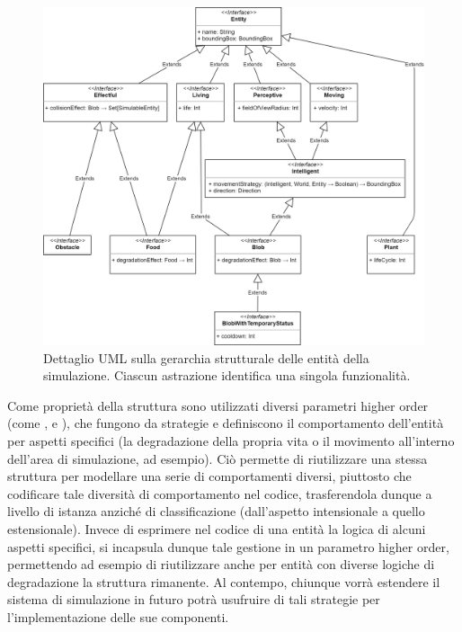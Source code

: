 \begin{figure}[h!]
\centering
\includegraphics[width=\textwidth, scale=0.44]{img/ModelHierarchy.png}
\caption{Dettaglio UML sulla gerarchia strutturale delle entità della simulazione. Ciascun astrazione identifica una singola funzionalità.}
\label{fig:modelhierarchy3}
\end{figure}

Come proprietà della struttura sono utilizzati diversi parametri higher order (come ,  e ), che fungono da strategie e definiscono il comportamento dell’entità per aspetti specifici (la degradazione della propria vita o il movimento all’interno dell’area di simulazione, ad esempio). Ciò permette di riutilizzare una stessa struttura per modellare una serie di comportamenti diversi, piuttosto che codificare tale diversità di comportamento nel codice, trasferendola dunque a livello di istanza anziché di classificazione (dall’aspetto intensionale a quello estensionale). Invece di esprimere nel codice di una entità la logica di alcuni aspetti specifici, si incapsula dunque tale gestione in un parametro higher order, permettendo ad esempio di riutilizzare anche per entità con diverse logiche di degradazione la struttura rimanente. Al contempo, chiunque vorrà estendere il sistema di simulazione in futuro potrà usufruire di tali strategie per l’implementazione delle sue componenti.

